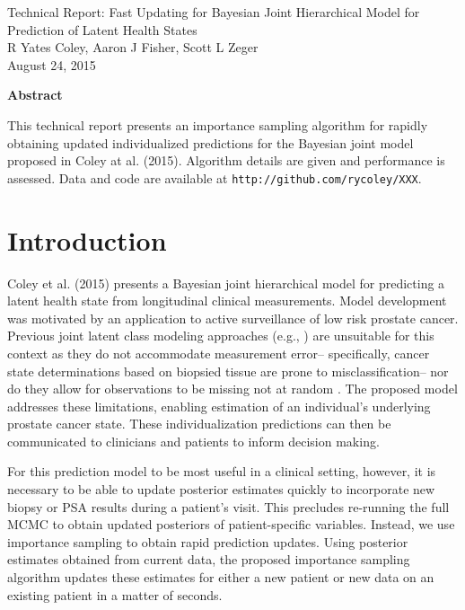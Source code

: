 \documentclass[12pt, letterpaper]{article}
\begin{document}
\begin{center}
\large Technical Report: Fast Updating for Bayesian Joint Hierarchical Model for Prediction of Latent Health States\\
R Yates Coley,  Aaron J Fisher,  Scott L Zeger\\
August 24, 2015\\
\end{center}

\begin{center}
\textbf{Abstract}

This technical report presents an importance sampling algorithm for rapidly obtaining updated individualized predictions for the Bayesian joint model proposed in Coley at al. (2015). Algorithm details are given and performance is assessed. Data and code are available at \texttt{http://github.com/rycoley/XXX}.
\end{center}


\section{Introduction}
Coley et al. (2015) presents a Bayesian joint hierarchical model for predicting a latent health state from longitudinal clinical measurements. Model development was motivated by an application to active surveillance of low risk prostate cancer. Previous joint latent class modeling approaches (e.g., \cite{Lin2002}) are unsuitable for this context as they do not accommodate measurement error-- specifically, cancer state determinations based on biopsied tissue are prone to misclassification-- nor do they allow for observations to be missing not at random \cite{Little2014}. The proposed model addresses these limitations, enabling estimation of an individual's underlying prostate cancer state. These individualization predictions can then be communicated to clinicians and patients to inform decision making.  

For this prediction model to be most useful in a clinical setting, however, it is necessary to be able to update posterior estimates quickly to incorporate new biopsy or PSA results during a patient's visit. This precludes re-running the full MCMC to obtain updated posteriors of patient-specific variables. Instead, we use importance sampling \cite{Bishop2006} to obtain rapid prediction updates. Using posterior estimates obtained from current data, the proposed importance sampling algorithm updates these estimates for either a new patient or new data on an existing patient in a matter of seconds. 
\end{document}
